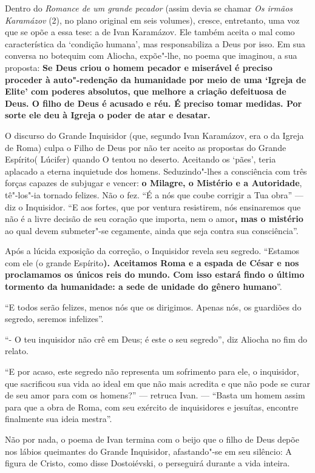 Dentro do \emph{Romance de um grande pecador} (assim devia se chamar
\emph{Os irmãos Karamázov} (2), no plano original em seis volumes),
cresce, entretanto, uma voz que se opõe a essa tese: a de Ivan
Karamázov. Ele também aceita o mal como característica da `condição
humana', mas responsabiliza a Deus por isso. Em sua conversa no botequim
com Aliocha, expõe"-lhe, no poema que imaginou, a sua proposta:
\textbf{Se Deus criou o homem pecador e miserável é preciso proceder à
auto"-redenção da humanidade por meio de uma `Igreja de Elite' com
poderes absolutos, que melhore a criação defeituosa de Deus. O filho de
Deus é acusado e réu. É preciso tomar medidas. Por sorte ele deu à
Igreja o poder de atar e desatar.}

O discurso do Grande Inquisidor (que, segundo Ivan Karamázov, era o da
Igreja de Roma) culpa o Filho de Deus por não ter aceito as propostas do
Grande Espírito( Lúcifer) quando O tentou no deserto. Aceitando os
`pães', teria aplacado a eterna inquietude dos homens. Seduzindo"-lhes a
consciência com três forças capazes de subjugar e vencer: \textbf{o
Milagre, o Mistério e a Autoridade}, tê"-los"-ia tornado felizes. Não o
fez. ``É a nós que coube corrigir a Tua obra'' --- diz o Inquisidor. ``E
aos fortes, que por ventura resistirem, nós ensinaremos que não é a
livre decisão de seu coração que importa, nem o amor\textbf{, mas o
mistério} ao qual devem submeter"-se cegamente, ainda que seja contra sua
consciência''.

Após a lúcida exposição da correção, o Inquisidor revela seu segredo.
``Estamos com ele (o grande Espírito\textbf{). Aceitamos Roma e a espada
de César e nos proclamamos os únicos reis do mundo. Com isso estará
findo o último tormento da humanidade: a sede de unidade do gênero
humano}''.

``E todos serão felizes, menos nós que os dirigimos. Apenas nós, os
guardiões do segredo, seremos infelizes''.

``- O teu inquisidor não crê em Deus; é este o seu segredo'', diz
Aliocha no fim do relato.

``E por acaso, este segredo não representa um sofrimento para ele, o
inquisidor, que sacrificou sua vida ao ideal em que não mais acredita e
que não pode se curar de seu amor para com os homens?'' --- retruca Ivan.
--- ``Basta um homem assim para que a obra de Roma, com seu exército de
inquisidores e jesuítas, encontre finalmente sua ideia mestra''.

Não por nada, o poema de Ivan termina com o beijo que o filho de Deus
depõe nos lábios queimantes do Grande Inquisidor, afastando"-se em seu
silêncio: A figura de Cristo, como disse Dostoiévski, o perseguirá
durante a vida inteira.

